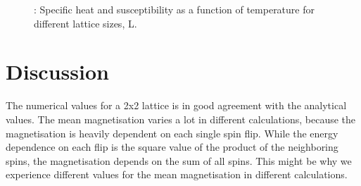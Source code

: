 \documentclass{article}
\begin{document}
{{{		\begin{figure}[H]
		\caption{: Specific heat and susceptibility as a function of temperature for different lattice sizes, L.}
		\label{fig:heat_susc}
		\end{figure}



\newpage
\section{Discussion}

	The numerical values for a 2x2 lattice is in good agreement with the analytical values. The mean magnetisation varies a lot in different calculations, because the magnetisation is heavily dependent on each single spin flip. While the energy dependence on each flip is the square value of the product of the neighboring spins, the magnetisation depends on the sum of all spins. This might be why we experience different values for the mean magnetisation in different calculations.\\

}}}
\end{document}
